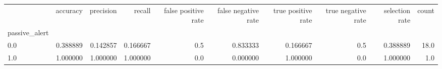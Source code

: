 \begin{tabular}{lrrrrrrrrr}
\toprule
{} &  accuracy &  precision &    recall &  false positive rate &  false negative rate &  true positive rate &  true negative rate &  selection rate &  count \\
passive\_alert &           &            &           &                      &                      &                     &                     &                 &        \\
\midrule
0.0           &  0.388889 &   0.142857 &  0.166667 &                  0.5 &             0.833333 &            0.166667 &                 0.5 &        0.388889 &   18.0 \\
1.0           &  1.000000 &   1.000000 &  1.000000 &                  0.0 &             0.000000 &            1.000000 &                 0.0 &        1.000000 &    1.0 \\
\bottomrule
\end{tabular}

